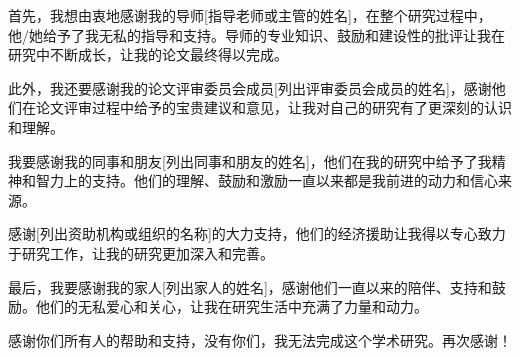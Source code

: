 \begin{acknowledgements}
  首先，我想由衷地感谢我的导师[指导老师或主管的姓名]，在整个研究过程中，他/她给予了我无私的指导和支持。导师的专业知识、鼓励和建设性的批评让我在研究中不断成长，让我的论文最终得以完成。

  此外，我还要感谢我的论文评审委员会成员[列出评审委员会成员的姓名]，感谢他们在论文评审过程中给予的宝贵建议和意见，让我对自己的研究有了更深刻的认识和理解。
  
  我要感谢我的同事和朋友[列出同事和朋友的姓名]，他们在我的研究中给予了我精神和智力上的支持。他们的理解、鼓励和激励一直以来都是我前进的动力和信心来源。
  
  感谢[列出资助机构或组织的名称]的大力支持，他们的经济援助让我得以专心致力于研究工作，让我的研究更加深入和完善。
  
  最后，我要感谢我的家人[列出家人的姓名]，感谢他们一直以来的陪伴、支持和鼓励。他们的无私爱心和关心，让我在研究生活中充满了力量和动力。
  
  感谢你们所有人的帮助和支持，没有你们，我无法完成这个学术研究。再次感谢！
\end{acknowledgements}